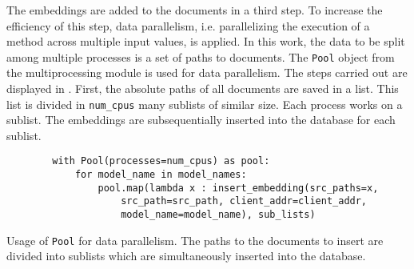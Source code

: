 
The embeddings are added to the documents in a third step.
To increase the efficiency of this step, data parallelism, i.e. parallelizing the execution of a method across multiple input values, is applied.
In this work, the data to be split among multiple processes is a set of paths to documents.
The \texttt{Pool} object from the multiprocessing module is used for data parallelism.
The steps carried out are displayed in .
First, the absolute paths of all documents are saved in a list.
This list is divided in \texttt{num\_cpus} many sublists of similar size.
Each process works on a sublist.
The embeddings are subsequentially inserted into the database for each sublist. 

\begin{listing}[htp]
    \begin{verbatim}
        with Pool(processes=num_cpus) as pool:
            for model_name in model_names:
                pool.map(lambda x : insert_embedding(src_paths=x, 
                    src_path=src_path, client_addr=client_addr, 
                    model_name=model_name), sub_lists)
    \end{verbatim}
    \caption[Usage of \texttt{Pool} for data parallelism]
    {Usage of \texttt{Pool} for data parallelism.
    The paths to the documents to insert are divided into sublists which are simultaneously inserted into the database.
    }
    \label{lst:db_Pool_embeddings}
\end{listing}

